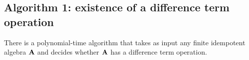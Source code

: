 
\subsection{Algorithm 1: existence of a difference term operation}
\label{sec:algor-1}
\begin{corollary}
  \label{cor:algor-1}
  There is a polynomial-time algorithm that takes as input
  any finite idempotent algebra $\mathbf{A}$ and decides whether
  $\mathbf{A}$ has a difference term operation.
\end{corollary}
